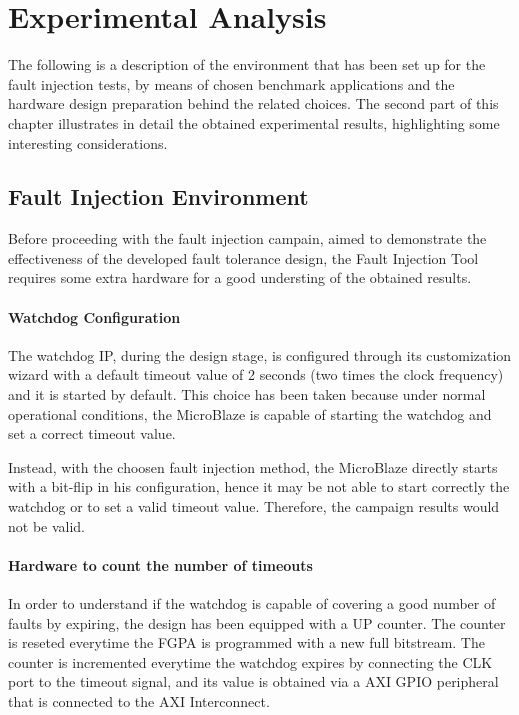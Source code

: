 \chapter{Experimental Analysis}

The following is a description of the environment that has been set up for the fault injection tests, by means of chosen benchmark applications and the hardware design preparation behind the related choices. The second part of this chapter illustrates in detail the obtained experimental results, highlighting some interesting considerations.

\section{Fault Injection Environment}

Before proceeding with the fault injection campain, aimed to demonstrate the effectiveness of the developed fault tolerance design, the Fault Injection Tool requires some extra hardware for a good understing of the obtained results.

\subsubsection{Watchdog Configuration}
The watchdog IP, during the design stage, is configured through its customization wizard with a default timeout value of 2 seconds (two times the clock frequency) and it is started by default. This choice has been taken because under normal operational conditions, the MicroBlaze is capable of starting the watchdog and set a correct timeout value.\bigskip
 
Instead, with the choosen fault injection method, the MicroBlaze directly starts with a bit-flip in his configuration, hence it may be not able to start correctly the watchdog or to set a valid timeout value. Therefore, the campaign results would not be valid.\bigskip

\subsubsection{Hardware to count the number of timeouts}
In order to understand if the watchdog is capable of covering a good number of faults by expiring, the design has been equipped with a UP counter. The counter is reseted everytime the FGPA is programmed with a new full bitstream. The counter is incremented everytime the watchdog expires by connecting the CLK port to the timeout signal, and its value is obtained via a AXI GPIO peripheral that is connected to the AXI Interconnect. \bigskip

